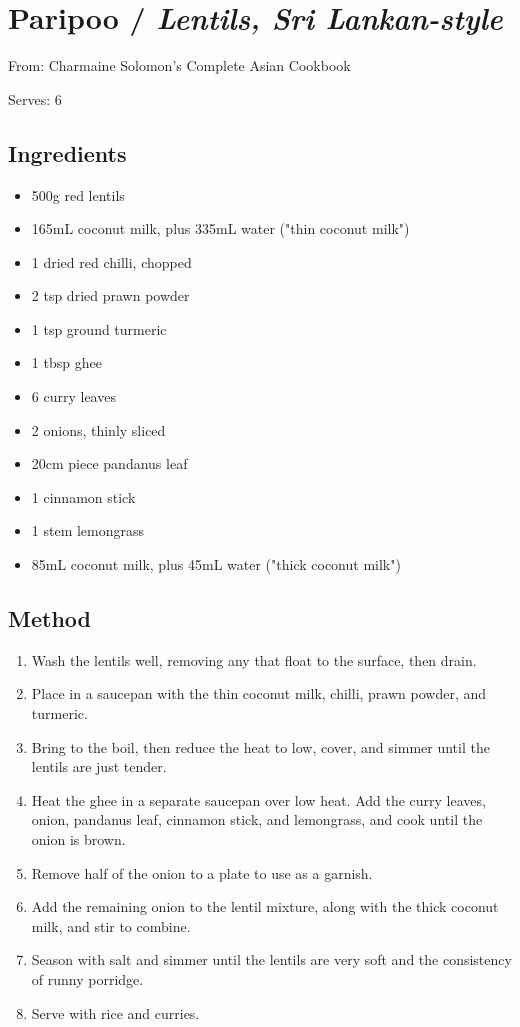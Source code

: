 \section{Paripoo / \emph{Lentils, Sri Lankan-style}}


From: Charmaine Solomon's Complete Asian Cookbook

Serves: 6

\subsection{Ingredients}

\begin{itemize}
	\item 500g red lentils
	\item 165mL coconut milk, plus 335mL water ("thin coconut milk")
	\item 1 dried red chilli, chopped
	\item 2 tsp dried prawn powder
	\item 1 tsp ground turmeric
	\item 1 tbsp ghee
	\item 6 curry leaves
	\item 2 onions, thinly sliced
	\item 20cm piece pandanus leaf
	\item 1 cinnamon stick
	\item 1 stem lemongrass
	\item 85mL coconut milk, plus 45mL water ("thick coconut milk")
\end{itemize}

\subsection{Method}

\begin{enumerate}
    \item Wash the lentils well, removing any that float to the surface, then drain. 
    \item Place in a saucepan with the thin coconut milk, chilli, prawn powder, and turmeric.
    \item Bring to the boil, then reduce the heat to low, cover, and simmer until the lentils are just tender. 
    \item Heat the ghee in a separate saucepan over low heat. Add the curry leaves, onion, pandanus leaf, cinnamon stick, and lemongrass, and cook until the onion is brown.
    \item Remove half of the onion to a plate to use as a garnish.
    \item Add the remaining onion to the lentil mixture, along with the thick coconut milk, and stir to combine.
    \item Season with salt and simmer until the lentils are very soft and the consistency of runny porridge.
    \item Serve with rice and curries.
\end{enumerate}
